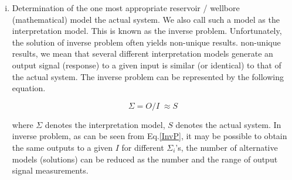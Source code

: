 \documentclass{llncs}
\numberwithin{equation}{section}
\numberwithin{figure}{section}
\numberwithin{table}{section}
\begin{document}
    \begin{enumerate}[(i)]
        \item Determination of the one most appropriate reservoir / wellbore (mathematical) model  the actual system. We also call such a model as the interpretation model.  This is known as the inverse problem.  Unfortunately, the solution of inverse problem often yields non-unique results.  non-unique results, we mean that several different interpretation models  generate an output signal (response) to a given input  is similar (or identical) to that of the actual system. The inverse problem can be represented by the following equation.

        \begin{equation}
            \Sigma ={O}/{I}\;\approx S
            \label{InvP}
        \end{equation}

            where $\Sigma$ denotes the interpretation model, $S$ denotes the actual system. In inverse problem, as can be seen from Eq.\ref{InvP}, it may be possible to obtain the same outputs to a given $I$ for different $\Sigma_{i}$'s, the number of alternative models (solutions) can be reduced as the number and the range of output signal measurements.\\


\end{enumerate}
\end{document}
